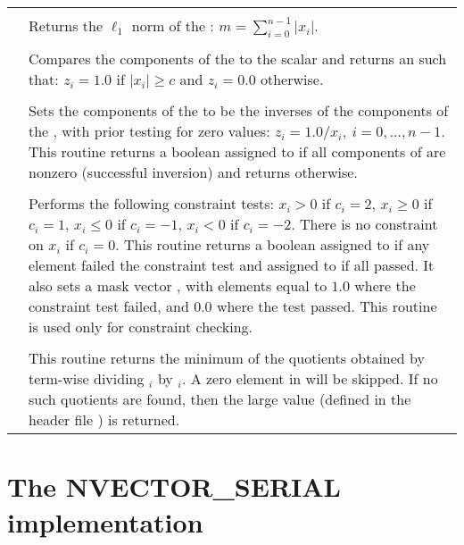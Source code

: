 \begin{xtabular}{|p{\colone}|p{\coltwo}|}
 &  \\
& Returns the $\ell_1$ norm of the  :
$m = \sum_{i=0}^{n-1} | x_i |$.
\\[2mm]
 &  \\
& Compares the components of the   to the 
scalar  and returns an   such that:
$z_i = 1.0$ if $| x_i | \ge c$ and $z_i = 0.0$ otherwise.
\\[2mm]
 &  \\
& Sets the components of the   to be the inverses
of the components of the  , with prior testing
for zero values:
$z_i = 1.0 /  x_i  , \: i=0,\ldots,n-1$.
This routine returns a boolean assigned to  if all 
components of  are
nonzero (successful inversion) and returns  otherwise.  
\\[2mm]
 &  \\
& Performs the following constraint tests:
$x_i > 0$ if $c_i=2$,
$x_i \ge 0$ if $c_i=1$,
$x_i \le 0$ if $c_i=-1$,
$x_i < 0$ if $c_i=-2$.
There is no constraint on $x_i$ if $c_i=0$.
This routine returns a boolean assigned to  if any element failed
the constraint test and assigned to  if all passed.  It also sets a
mask vector , with elements equal to $1.0$ where the constraint 
test failed, and $0.0$ where the test passed.
This routine is used only for constraint checking.
\\[2mm]
 &  \\
& This routine returns the minimum of the quotients obtained   
by term-wise dividing $_i$ by $_i$. 
A zero element in  will be skipped. 
If no such quotients are found, then the large value 
 (defined in the header file )
is returned. 
\\
\end{xtabular}
\bigskip

\section{The NVECTOR\_SERIAL implementation}\label{ss:nvec_ser}


